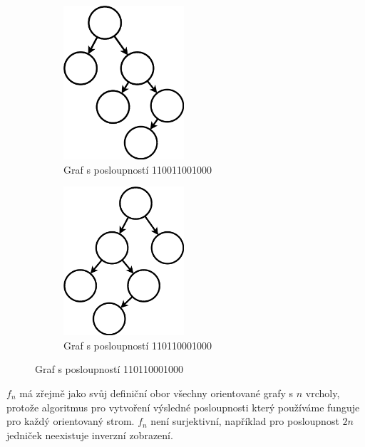 \documentclass[../main.tex]{subfiles}
\begin{document}
\begin{figure}[H]
    \begin{subfigure}[b]{0.49\textwidth}
        \centering
        \includegraphics*[width=0.49\textwidth]{images/tu3/110011001000.png}
        \caption*{Graf s posloupností 110011001000}
    \end{subfigure}
    \hfill
    \begin{subfigure}[b]{0.49\textwidth}
        \centering
        \includegraphics*[width=0.49\textwidth]{images/tu3/110110001000.png}
        \caption*{Graf s posloupností 110110001000}
    \end{subfigure}

\end{figure}


$f_n$ má zřejmě jako svůj definiční obor všechny orientované grafy s $n$ vrcholy, protože algoritmus pro vytvoření výsledné posloupnosti
který používáme funguje pro každý orientovaný strom. $f_n$ není surjektivní, například pro posloupnost $2n$ jedniček neexistuje inverzní zobrazení. 
\end{document}
